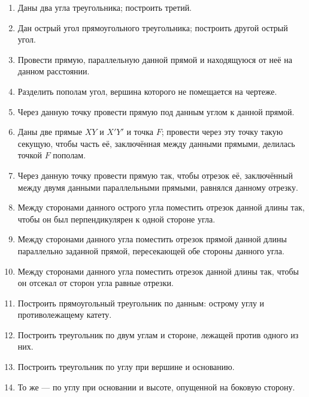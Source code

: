 \documentclass[oneside]{book}
\begin{document}
\begin{enumerate}[resume]

 \item
Даны два угла треугольника;
построить третий.

 \item
Дан острый угол прямоугольного треугольника;
построить другой острый угол.

 \item
Провести прямую, параллельную данной прямой и находящуюся от неё на данном расстоянии.

 \item
Разделить пополам угол, вершина которого не помещается на чертеже.

 \item
Через данную точку провести прямую под данным углом к данной прямой.

 \item
Даны две прямые $XY$ и $X'Y'$ и точка $F$;
провести через эту точку такую секущую, чтобы часть её, заключённая между данными прямыми, делилась точкой $F$ пополам.

 \item
Через данную точку провести прямую так, чтобы отрезок её, заключённый между двумя данными параллельными прямыми, равнялся данному отрезку.

 \item
Между сторонами данного острого угла поместить отрезок данной длины так, чтобы он был перпендикулярен к одной стороне угла.

 \item
Между сторонами данного угла поместить отрезок прямой данной длины параллельно заданной прямой, пересекающей обе стороны данного угла.

 \item
Между сторонами данного угла поместить отрезок данной длины так, чтобы он отсекал от сторон угла равные отрезки.

 \item
Построить прямоугольный треугольник по данным:
острому углу и противолежащему катету.

 \item
Построить треугольник по двум углам и стороне, лежащей против одного из них.

 \item
Построить  треугольник по углу при вершине и основанию.

 \item
То же — по углу при основании и высоте, опущенной на боковую сторону.


\end{enumerate}
\end{document}
